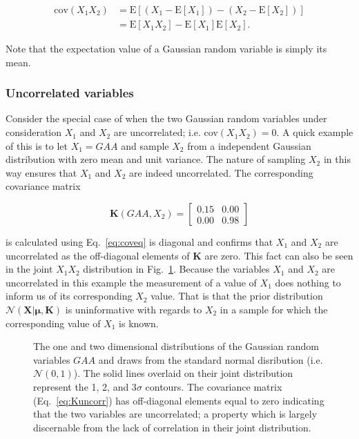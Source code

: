 \begin{align}
  \text{cov}(X_1X_2) &= \text{E}[(X_1-\text{E}[X_1]) - (X_2-\text{E}[X_2])] \\
  &= \text{E}[X_1X_2] - \text{E}[X_1]\text{E}[X_2].
  \label{eq:coveq}
\end{align}

\noindent Note that the expectation value of a Gaussian random variable is simply
its mean. \\

\subsubsection{Uncorrelated variables}
Consider the special case of when the two Gaussian random variables under
consideration $X_1$ and $X_2$ are uncorrelated; i.e. cov$(X_1X_2)=0$. A quick
example of this is to let $X_1=GAA$ and sample $X_2$ from a independent Gaussian
distribution with zero mean and unit variance.
The nature of sampling $X_2$ in this way ensures
that $X_1$ and $X_2$ are indeed uncorrelated. The corresponding covariance matrix

\begin{equation}
  \mathbf{K}(GAA,X_2) =
  \begin{bmatrix}
    0.15 & 0.00 \\
    0.00 & 0.98
  \end{bmatrix}
  \label{eq:Kuncorr}
\end{equation}

\noindent is calculated using Eq.~\ref{eq:coveq} is diagonal and confirms that
$X_1$ and $X_2$ are uncorrelated as the off-diagonal elements of $\mathbf{K}$ are zero.
This fact can also be seen in the joint $X_1X_2$ distribution in Fig.~\ref{fig:uncorr2d}.
Because the variables $X_1$ and $X_2$ are uncorrelated in this example the
measurement of a value of $X_1$ does nothing to inform us of its corresponding
$X_2$ value. That is that the prior distribution
$\mathcal{N}(\mathbf{X}|\boldsymbol{\mu},\mathbf{K})$ is uninformative with regards to
$X_2$ in a sample for which the corresponding value of $X_1$ is known. \\

\begin{figure}
  \centering
  \caption[Uncorrelated Gaussian random variables in two dimensions.]
      {The one and two dimensional distributions of the Gaussian random
        variables $GAA$ and draws from the standard normal disribution (i.e. $\mathcal{N}(0,1)$).
        The solid
    lines overlaid on their joint distribution represent the 1, 2, and 3$\sigma$
    contours. The covariance matrix (Eq.~\ref{eq:Kuncorr}) has off-diagonal
    elements equal to zero indicating that the two variables are uncorrelated;
    a property which is largely discernable from the lack of correlation in their joint
    distribution.}
  \label{fig:uncorr2d}
\end{figure}

